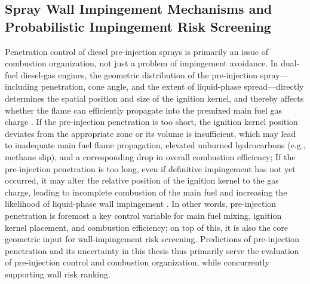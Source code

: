 \subsection{Spray Wall Impingement Mechanisms and Probabilistic Impingement Risk Screening}\label{sec:wall-impingement-screening-en}

Penetration control of diesel pre-injection sprays is primarily an issue of combustion organization, not just a problem of impingement avoidance.
In dual-fuel diesel-gas engines, the geometric distribution of the pre-injection spray---including penetration, cone angle, and the extent of liquid-phase spread---directly determines the spatial position and size of the ignition kernel,
and thereby affects whether the flame can efficiently propagate into the premixed main fuel gas charge \cite{Karim2015DualFuel,WeiGeng2016DualFuelReview,Sahoo2009DualFuelReview}.
If the pre-injection penetration is too short, the ignition kernel position deviates from the appropriate zone or its volume is insufficient, which may lead to inadequate main fuel flame propagation, elevated unburned hydrocarbons (e.g., methane slip), and a corresponding drop in overall combustion efficiency;
If the pre-injection penetration is too long, even if definitive impingement has not yet occurred, it may alter the relative position of the ignition kernel to the gas charge, leading to incomplete combustion of the main fuel and increasing the likelihood of liquid-phase wall impingement \cite{WeiGeng2016DualFuelReview,Sahoo2009DualFuelReview}.
In other words, pre-injection penetration is foremost a key control variable for main fuel mixing, ignition kernel placement, and combustion efficiency;
on top of this, it is also the core geometric input for wall-impingement risk screening.
Predictions of pre-injection penetration and its uncertainty in this thesis thus primarily serve the evaluation of pre-injection control and combustion organization, while concurrently supporting wall risk ranking.

